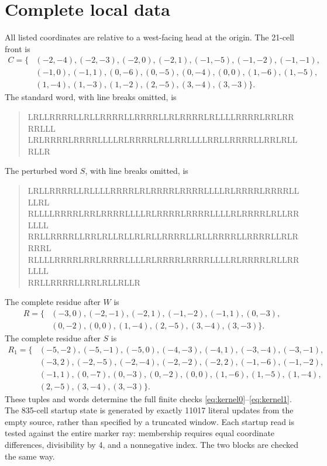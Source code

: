 \documentclass[11pt]{article}
\theoremstyle{definition}\newtheorem{definition}[theorem]{Definition}
\theoremstyle{remark}\newtheorem{remark}[theorem]{Remark}
\begin{document}
\section{Complete local data}\label{app:data}
All listed coordinates are relative to a west-facing head at the origin.
The 21-cell front is
\[
\begin{split}
C=\{&(-2,-4),(-2,-3),(-2,0),(-2,1),(-1,-5),(-1,-2),(-1,-1),\\
&(-1,0),(-1,1),(0,-6),(0,-5),(0,-4),(0,0),(1,-6),(1,-5),\\
&(1,-4),(1,-3),(1,-2),(2,-5),(3,-4),(3,-3)\}.
\end{split}
\]
The standard word, with line breaks omitted, is
\begin{quote}\ttfamily\small
LRLLRRRRLLRLLRRRRLLRRRRLLRLRRRRLRLLLLRRRRLRRLRRRRLLL\\
LRLRRRRLRRRRLLLLRLRRRRLRLLRRLLLLRRLLRRRRLLRRLRLLRLLR
\end{quote}
The perturbed word $S$, with line breaks omitted, is
\begin{quote}\ttfamily\small
LRLLRRRRLLRLLLLRRRRLRLRRRRLRRRRLLLLRLRRRRLRRRRLLLLRL\\
RLLLLRRRRLRRLRRRRLLLLRLRRRRLRRRRLLLLRLRRRRLRLLRRLLLL\\
RRLLRRRRLLRRLRLLRLLRLRLLRRRRLLRLLRRRRLLRRRRLLRLRRRRL\\
RLLLLRRRRLRRLRRRRLLLLRLRRRRLRRRRLLLLRLRRRRLRLLRRLLLL\\
RRLLRRRRLLRRLRLLRLLR
\end{quote}
The complete residue after $W$ is
\[
\begin{split}
R=\{&(-3,0),(-2,-1),(-2,1),(-1,-2),(-1,1),(0,-3),\\
 &(0,-2),(0,0),(1,-4),(2,-5),(3,-4),(3,-3)\}.
\end{split}
\]
The complete residue after $S$ is
\[
\begin{split}
R_1=\{&(-5,-2),(-5,-1),(-5,0),(-4,-3),(-4,1),(-3,-4),(-3,-1),\\
&(-3,2),(-2,-5),(-2,-4),(-2,-2),(-2,2),(-1,-6),(-1,-2),\\
&(-1,1),(0,-7),(0,-3),(0,-2),(0,0),(1,-6),(1,-5),(1,-4),\\
&(2,-5),(3,-4),(3,-3)\}.
\end{split}
\]
These tuples and words determine the full finite checks
\eqref{eq:kernel0}--\eqref{eq:kernel1}. The 835-cell startup state is generated
by exactly 11017 literal updates from the empty source, rather than specified
by a truncated window. Each startup read is tested against the entire marker
ray: membership requires equal coordinate differences, divisibility by 4,
and a nonnegative index. The two blocks are checked the same way.
\end{document}
